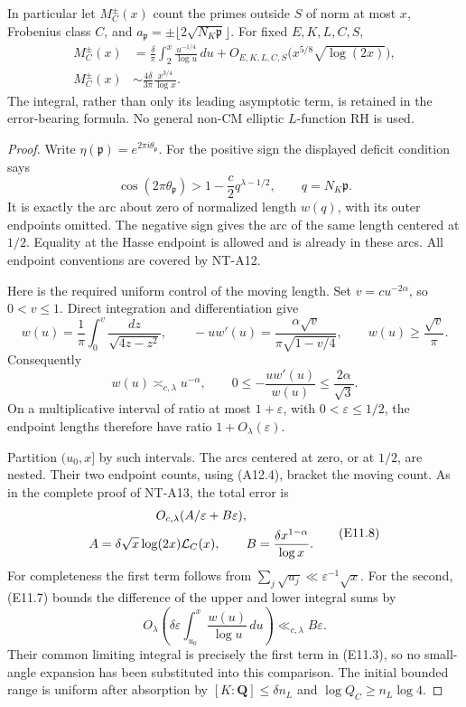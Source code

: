 In particular let \(M_C^\pm(x)\) count the primes outside \(S\)
of norm at most \(x\), Frobenius class \(C\), and
\(a_{\mathfrak p}=\pm\lfloor2\sqrt{N_K\mathfrak p}\rfloor\).
For fixed \(E,K,L,C,S\),
\[
 \begin{split}
 M_C^\pm(x)
     &=\frac{\delta}{\pi}
          \int_2^x\frac{u^{-1/4}}{\log u}\,du
                +O_{E,K,L,C,S}\bigl(x^{5/8}\sqrt{\log(2x)}\bigr),\\
 M_C^\pm(x)&\sim
             \frac{4\delta}{3\pi}\frac{x^{3/4}}{\log x}.
 \end{split}                                                   \tag{E11.6}
\]
The integral, rather than only its leading asymptotic term, is
retained in the error-bearing formula. No general non-CM
elliptic \(L\)-function RH is used.

\begin{proof}
Write \(\eta(\mathfrak p)=e^{2\pi i\theta_{\mathfrak p}}\).
For the positive sign the displayed deficit condition says
\[
 \cos(2\pi\theta_{\mathfrak p})
                      >1-\frac c2 q^{\lambda-1/2},
                \qquad q=N_K\mathfrak p .
 \]
It is exactly the arc about zero of normalized length \(w(q)\),
with its outer endpoints omitted. The negative sign gives
the arc of the same length centered at \(1/2\). Equality
at the Hasse endpoint is allowed and is already in these
arcs. All endpoint conventions are covered by NT-A12.

Here is the required uniform control of the moving length.
Set \(v=cu^{-2\alpha}\), so \(0<v\le1\). Direct integration
and differentiation give
\[
 w(u)=\frac1\pi\int_0^v\frac{dz}{\sqrt{4z-z^2}},
 \qquad
 -u w'(u)=\frac{\alpha\sqrt v}{\pi\sqrt{1-v/4}},
 \qquad w(u)\ge\frac{\sqrt v}{\pi}.
 \]
Consequently
\[
 w(u)\asymp_{c,\lambda}u^{-\alpha},\qquad
    0\le-\frac{u w'(u)}{w(u)}
                    \le\frac{2\alpha}{\sqrt3}.            \tag{E11.7}
\]
On a multiplicative interval of ratio at most
\(1+\varepsilon\), with \(0<\varepsilon\le1/2\),
the endpoint lengths therefore have ratio
\(1+O_\lambda(\varepsilon)\).

Partition \((u_0,x]\) by such intervals. The arcs centered
at zero, or at \(1/2\), are nested. Their two endpoint
counts, using (A12.4), bracket the moving count. As in the
complete proof of NT-A13, the total error is
\[
 \begin{gathered}
 O_{c,\lambda}(A/\varepsilon+B\varepsilon),\\
 A=\delta\sqrt x\log(2x){\cal L}_C(x),\qquad
 B=\frac{\delta x^{1-\alpha}}{\log x}.
 \end{gathered}                                           \tag{E11.8}
\]
For completeness the first term follows from
\(\sum_j\sqrt{u_j}\ll\varepsilon^{-1}\sqrt x\).
For the second, (E11.7) bounds the difference of the
upper and lower integral sums by
\[
 O_\lambda\left(\delta\varepsilon
                    \int_{u_0}^x\frac{w(u)}{\log u}\,du\right)
             \ll_{c,\lambda} B\varepsilon .
 \]
Their common limiting integral is precisely the first
term in (E11.3), so no small-angle expansion has been
substituted into this comparison. The initial bounded
range is uniform after absorption by
\([K:\mathbf Q]\le\delta n_L\) and
\(\log Q_C\ge n_L\log4\).


\end{proof}
